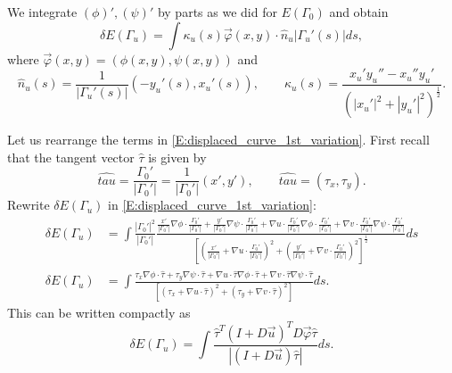 \documentclass[10pt,a4paper]{article}
\begin{document}
We integrate $(\phi)',(\psi)'$ by parts as we did for $E(\Gamma_0)$ and obtain
%
\begin{equation*}
\delta E(\Gamma_u) = \int \kappa_u(s) \vec{\varphi}(x,y) \cdot \hat{n}_u |\Gamma_u'(s)| ds,
\end{equation*}
%
where $\vec{\varphi}(x,y)=(\phi(x,y),\psi(x,y))$ and
\[
\hat{n}_u(s)=\frac{1}{|\Gamma_u'(s)|} (-y_u'(s),x_u'(s)), \qquad
\kappa_u(s) = \frac{x_u' y_u'' - x_u'' y_u'}{\left( |x_u'|^2 + |y_u'|^2 \right)^{\frac{1}{2}}}. 
\]

Let us rearrange the terms in \eqref{E:displaced_curve_1st_variation}.
First recall that the tangent vector $\hat{\tau}$ is given by
\[
\hat{tau} = \frac{\Gamma_0'}{|\Gamma_0'|} = \frac{1}{|\Gamma_0'|} (x',y'), \qquad 
\hat{tau} = (\tau_x,\tau_y).
\]
Rewrite $\delta E(\Gamma_u)$  in \eqref{E:displaced_curve_1st_variation}:
%
\begin{align*}
\delta E(\Gamma_u) &= \int
\frac{|\Gamma_0'|^2}{|\Gamma_0'|}
\frac{ \frac{x'}{|\Gamma_0'|} \nabla\phi \cdot \frac{\Gamma_0' }{|\Gamma_0'|}
+ \frac{y'}{|\Gamma_0'|} \nabla\psi \cdot \frac{\Gamma_0' }{|\Gamma_0'|}
+ \nabla u \cdot \frac{\Gamma_0'}{|\Gamma_0'|} \nabla\phi \cdot \frac{\Gamma_0'}{|\Gamma_0'|} 
+ \nabla v \cdot \frac{\Gamma_0'}{|\Gamma_0'|} \nabla\psi \cdot \frac{\Gamma_0'}{|\Gamma_0'|} }
{\left[ \left( \frac{x'}{|\Gamma_0'|} + \nabla u \cdot \frac{\Gamma_0'}{|\Gamma_0'|} \right)^2 +          
\left( \frac{y'}{|\Gamma_0'|} + \nabla v \cdot \frac{\Gamma_0'}{|\Gamma_0'|} \right)^2  \right]^\frac{1}{2}} ds \\
\delta E(\Gamma_u) &= \int
\frac{\tau_x \nabla\phi \cdot \hat{\tau} + \tau_y \nabla\psi \cdot \hat{\tau}
+ \nabla u \cdot \hat{\tau} \nabla\phi \cdot \hat{\tau}
+ \nabla v \cdot \hat{\tau} \nabla\psi \cdot \hat{\tau}}
{\left[ (\tau_x + \nabla u \cdot \hat{\tau})^2 + (\tau_y + \nabla v \cdot \hat{\tau})^2 \right]} ds.
\end{align*}
%
This can be written compactly as
\[
\delta E(\Gamma_u) = \int
\frac{\hat{\tau}^T (I + D\vec{u})^T D\vec{\varphi} \hat{\tau}}{|(I+D\vec{u})\hat{\tau}|} ds.
\]
\end{document}
